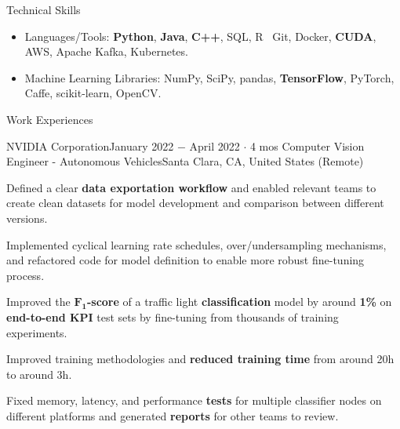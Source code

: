\documentclass{resume}
\begin{document}
\begin{rSection}{Technical Skills}

    \begin{itemize}
        \item Languages/Tools: \textbf{Python}, \textbf{Java}, \textbf{C++}, SQL, R \textbar\ Git, Docker, \textbf{CUDA}, AWS, Apache Kafka, Kubernetes.
        \item Machine Learning Libraries: NumPy, SciPy, pandas, \textbf{TensorFlow}, PyTorch, Caffe, scikit-learn, OpenCV.
    \end{itemize}

\end{rSection}

\begin{rSection}{Work Experiences}

    \begin{rSubsection}{NVIDIA Corporation}{January 2022 \(-\) April 2022 \(\cdot\) 4 mos}
        {Computer Vision Engineer - Autonomous Vehicles}{Santa Clara, CA, United States (Remote)}
        \item Defined a clear \textbf{data exportation workflow} and enabled relevant teams to create clean datasets for model development
        and comparison between different versions.
        \item Implemented cyclical learning rate schedules, over/undersampling mechanisms, and refactored code for model definition
        to enable more robust fine-tuning process.
        \item Improved the \(\boldsymbol{F_{1}}\)\textbf{-score} of a traffic light \textbf{classification} model by around \textbf{1\%} on \textbf{end-to-end KPI} test sets
        by fine-tuning from thousands of training experiments.
        \item Improved training methodologies and \textbf{reduced training time} from around 20h to around 3h.
        \item Fixed memory, latency, and performance \textbf{tests} for multiple classifier nodes on different platforms and generated \textbf{reports} for other teams to review.
    \end{rSubsection}


\end{rSection}
\end{document}
